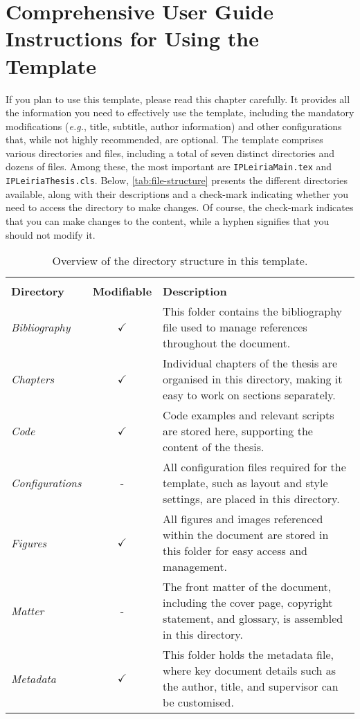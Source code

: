 \chapter[Comprehensive User Guide: Instructions for Using the Template]{Comprehensive User Guide Instructions for Using the Template}
\label{cp:user-guide}

{
\parindent0pt

If you plan to use this template, please read this chapter carefully. It provides all the information you need to effectively use the template, including the mandatory modifications (\textit{e.g.}, title, subtitle, author information) and other configurations that, while not highly recommended, are optional. The template comprises various directories and files, including a total of seven distinct directories and dozens of files. Among these, the most important are \texttt{IPLeiriaMain.tex} and \texttt{IPLeiriaThesis.cls}. Below, \autoref{tab:file-structure} presents the different directories available, along with their descriptions and a check-mark indicating whether you need to access the directory to make changes. Of course, the check-mark indicates that you can make changes to the content, while a hyphen signifies that you should not modify it.

\begin{table}[!htpb]
    \setlength{\extrarowheight}{2pt}
    \caption[Directory structure and file organisation]{Overview of the directory structure in this template.}
    \label{tab:file-structure}
    \begin{tabularx}{\textwidth}{lcX}
        \toprule
        \\[-1.5\normalbaselineskip]
        \textbf{Directory} & \textbf{Modifiable} & \textbf{Description} \\ [0em]
        \midrule
        \textit{Bibliography} & $\checkmark$ & This folder contains the bibliography file used to manage references throughout the document. \\
        \textit{Chapters} & $\checkmark$ & Individual chapters of the thesis are organised in this directory, making it easy to work on sections separately. \\
        \textit{Code} & $\checkmark$ & Code examples and relevant scripts are stored here, supporting the content of the thesis. \\
        \textit{Configurations} & - & All configuration files required for the template, such as layout and style settings, are placed in this directory. \\
        \textit{Figures} & $\checkmark$ & All figures and images referenced within the document are stored in this folder for easy access and management. \\
        \textit{Matter} & - & The front matter of the document, including the cover page, copyright statement, and glossary, is assembled in this directory. \\
        \textit{Metadata} & $\checkmark$ & This folder holds the metadata file, where key document details such as the author, title, and supervisor can be customised. \\
        \bottomrule
    \end{tabularx}
\end{table}

}
